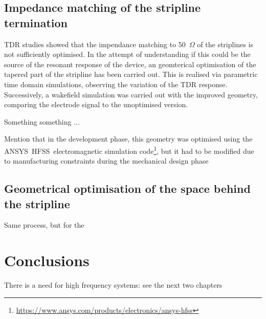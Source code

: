 \subsection[Impedance matching of the stripline termination]{Impedance matching of the stripline termination}

TDR studies showed that the impendance matching to 50~$\Omega$ of the striplines is not sufficiently optimised. In the attempt of understanding if this could be the source of the resonant response of the device, an geomterical optimisation of the tapered part of the stripline has been carried out. This is realised via parametric time domain simulations, observing the variation of the TDR response. Successively, a wakefield simulation was carried out with the improved geometry, comparing the electrode signal to the unoptimised version.

Something something ...

Mention that in the development phase, this geometry was optimised using the ANSYS\textregistered~HFSS\texttrademark~electromagnetic simulation code\footnote{\url{https://www.ansys.com/products/electronics/ansys-hfss}}, but it had to be modified due to manufacturing constraints during the mechanical design phase\cite{Victor:private-comm}


\subsection[Geometrical optimisation of the space behind the stripline]{Geometrical optimisation of the space behind the stripline}

Same process, but for the



\section[Conclusions]{Conclusions}

There is a need for high frequency systems: see the next two chapters
